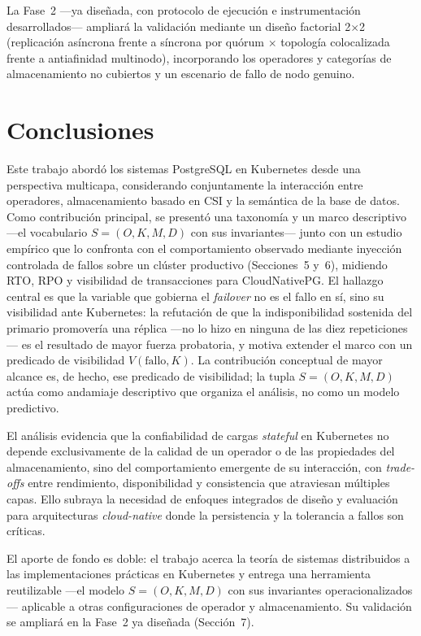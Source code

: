\documentclass[12pt,twocolumn,letterpaper]{article}
\begin{document}
La Fase~2 —ya diseñada, con protocolo de ejecución e instrumentación desarrollados— ampliará la validación mediante un diseño factorial 2$\times$2 (replicación asíncrona frente a síncrona por quórum $\times$ topología colocalizada frente a antiafinidad multinodo), incorporando los operadores y categorías de almacenamiento no cubiertos y un escenario de fallo de nodo genuino.

\section{Conclusiones}
Este trabajo abordó los sistemas PostgreSQL en Kubernetes desde una perspectiva multicapa, considerando conjuntamente la interacción entre operadores, almacenamiento basado en CSI y la semántica de la base de datos. Como contribución principal, se presentó una taxonomía y un marco descriptivo —el vocabulario $S=(O,K,M,D)$ con sus invariantes— junto con un estudio empírico que lo confronta con el comportamiento observado mediante inyección controlada de fallos sobre un clúster productivo (Secciones~5 y~6), midiendo RTO, RPO y visibilidad de transacciones para CloudNativePG. El hallazgo central es que la variable que gobierna el \textit{failover} no es el fallo en sí, sino su visibilidad ante Kubernetes: la refutación de que la indisponibilidad sostenida del primario promovería una réplica —no lo hizo en ninguna de las diez repeticiones— es el resultado de mayor fuerza probatoria, y motiva extender el marco con un predicado de visibilidad $V(\text{fallo},K)$. La contribución conceptual de mayor alcance es, de hecho, ese predicado de visibilidad; la tupla $S=(O,K,M,D)$ actúa como andamiaje descriptivo que organiza el análisis, no como un modelo predictivo.

El análisis evidencia que la confiabilidad de cargas \textit{stateful} en Kubernetes no depende exclusivamente de la calidad de un operador o de las propiedades del almacenamiento, sino del comportamiento emergente de su interacción, con \textit{trade-offs} entre rendimiento, disponibilidad y consistencia que atraviesan múltiples capas. Ello subraya la necesidad de enfoques integrados de diseño y evaluación para arquitecturas \textit{cloud-native} donde la persistencia y la tolerancia a fallos son críticas.

El aporte de fondo es doble: el trabajo acerca la teoría de sistemas distribuidos a las implementaciones prácticas en Kubernetes y entrega una herramienta reutilizable —el modelo $S=(O,K,M,D)$ con sus invariantes operacionalizados— aplicable a otras configuraciones de operador y almacenamiento. Su validación se ampliará en la Fase~2 ya diseñada (Sección~7).
\end{document}
